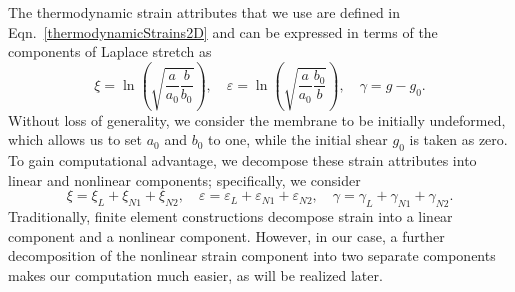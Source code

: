 The thermodynamic strain attributes that we use are defined in Eqn.~\eqref{thermodynamicStrains2D} and can be expressed in terms of the components of Laplace stretch as
\begin{equation}
\xi = \ln\left( \sqrt{\frac{a}{a_0} \frac{b}{b_0}} \right) ,
\quad
\varepsilon = \ln\left(\sqrt{\frac{a}{a_0} \frac{b_0}{b}} \right) ,
\quad 
\gamma = g - g_0.
\label{strainAttributesPentagon}
\end{equation}
Without loss of generality, we consider the membrane to be initially undeformed, which allows us to set $a_0$ and $b_0$ to one, while the initial shear $g_0$ is taken as zero.  To gain computational advantage, we decompose these strain attributes into linear and nonlinear components; specifically, we consider
\begin{equation}
\xi = \xi_{L} + \xi_{N1} + \xi_{N2} , \quad
\varepsilon = \varepsilon_{L} + \varepsilon_{N1} + \varepsilon_{N2} , \quad
\gamma = \gamma_{L} + \gamma_{N1} + \gamma_{N2}.
\label{totalVirtualStrain}
\end{equation}
Traditionally, finite element constructions decompose strain into a linear component and a non\-linear component.  However, in our case, a further decomposition of the non\-linear strain component into two separate components makes our computation much easier, as will be realized later. 

